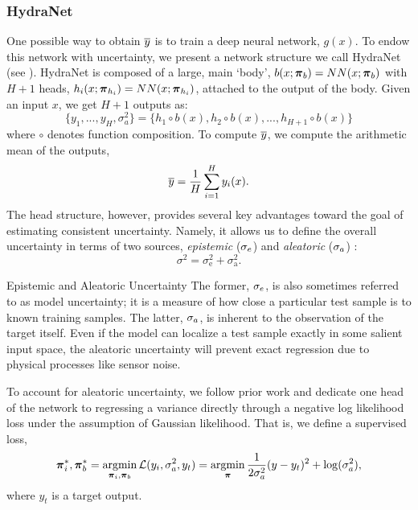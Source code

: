 \subsubsection{HydraNet}
One possible way to obtain $\overline{y}$ is to train a deep neural network, $g(x)$. To endow this network with uncertainty, we present a network structure we call HydraNet (see ). HydraNet is composed of a large, main `body', $b(x; \boldsymbol{\mathbf{\pi}}_b) = NN(x; \boldsymbol{\mathbf{\pi}}_b)$ with $H+1$ heads, $h_i(x; \boldsymbol{\mathbf{\pi}}_{h_i}) = NN(x; \boldsymbol{\mathbf{\pi}}_{h_i})$, attached to the output of the body. Given an input $x$, we get $H+1$ outputs as:
\begin{equation}
	\{y_1, ..., y_H, \sigma^2_a\} = \{h_1 \circ b (x), h_2 \circ b (x), ..., h_{H+1} \circ b (x)\}
\end{equation}
where $\circ$ denotes function composition. To compute  $\overline{y}$, we compute the arithmetic mean of the outputs,
\begin{equation}
\label{eq:hn_1d_mean}
\overline{y} = \frac{1}{H}\sum_{i=1}^{H}y_i(x).
\end{equation} 
The head structure, however, provides several key advantages toward the goal of estimating consistent uncertainty. Namely, it allows us to define the overall uncertainty in terms of two sources, \textit{epistemic} ($\sigma_e$) and \textit{aleatoric} ($\sigma_a$) \citep{Kendall2017-vs}:
\begin{equation}
\label{eq:1d_hydranet_uncertainty}
\sigma^2 = \sigma^2_{\text{e}} + \sigma^2_{\text{a}}.
\end{equation} 
\begin{remark}{Epistemic and Aleatoric Uncertainty}
	The former, $\sigma_e$, is also sometimes referred to as model uncertainty; it is a measure of how close a particular test sample is to known training samples. The latter, $\sigma_a$, is inherent to the observation of the target itself.  Even if the model can localize a test sample exactly in some salient input space, the aleatoric uncertainty will prevent exact regression due to physical processes like sensor noise.
\end{remark}

To account for aleatoric uncertainty, we follow prior work \citep{Haarnoja2016-ph,Lakshminarayanan2017} and dedicate one head of the network to regressing a variance directly through a negative log likelihood loss under the assumption of Gaussian likelihood. That is, we define a supervised loss,
\begin{equation}
\boldsymbol{\mathbf{\pi}}_i^*, \boldsymbol{\mathbf{\pi}}_b^* = \operatorname*{argmin}_{\boldsymbol{\mathbf{\pi}}_i, \boldsymbol{\mathbf{\pi}}_b} \mathcal{L}(y_i, \sigma_a^2, y_t) = \operatorname*{argmin}_{\boldsymbol{\mathbf{\pi}}} \frac{1}{2\sigma_a^2}(y-y_t)^2 	+ \log(\sigma_a^2),
\end{equation}
where $y_t$ is a target output.


